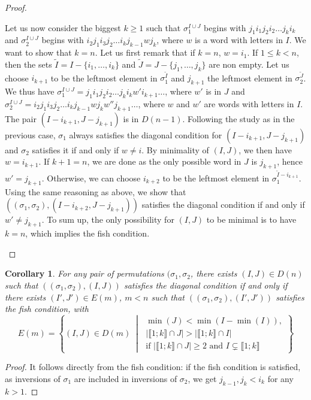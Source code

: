 \documentclass{amsart}
\newtheorem{corollary}[theorem]{Corollary}
\theoremstyle{definition}
\newcommand{\set}[2]{\left\{ #1 \;\middle|\; #2 \right\}} %
\begin{document}
\begin{proof}
\begin{itemize}
Let us now consider the biggest $k\geq 1$ such that $\sigma^{I \cup J}_1$ begins with $j_1 i_1 j_2 i_2 \ldots j_k i_k$ and $\sigma^{I \cup J}_2$ begins with $i_2 j_1 i_3 j_2\ldots i_k j_{k-1} w j_k$, where $w$ is a word with letters in $I$. We want to show that $k=n$. Let us first remark that if $k=n$, $w=i_1$. If $1\leq k<n$, then the sets $\tilde{I}=I-\{i_1, \ldots, i_k\}$ and $\tilde{J}=J-\{j_1, \ldots, j_k\}$ are non empty. Let us choose $i_{k+1}$ to be the leftmost element in $\sigma^{\tilde{I}}_1$ and $j_{k+1}$ the leftmost element in $\sigma^{\tilde{J}}_2$. We thus have $\sigma^{I \cup J}_1=j_1 i_1 j_2 i_2 \ldots j_k i_k w' i_{k+1}\ldots$, where $w'$ is in $J$ and $\sigma^{I \cup J}_2= i_2 j_1 i_3 j_2\ldots i_k j_{k-1} w j_k w'' j_{k+1}\ldots $, where $w$ and $w'$ are words with letters in $I$. The pair $(I-i_{k+1},J-j_{k+1})$ is in $D(n-1)$. Following the study as in the previous case, $\sigma_1$ always satisfies the diagonal condition for $(I-i_{k+1},J-j_{k+1})$ and $\sigma_2$ satisfies it if and only if $w \neq i$. By minimality of $(I,J)$, we then have $w=i_{k+1}$. If $k+1=n$, we are done as the only possible word in $J$ is $j_{k+1}$, hence $w'=j_{k+1}$. Otherwise, we can choose $i_{k+2}$ to be the leftmost element in $\sigma_1^{\tilde{I}-i_{k+1}}$. Using the same reasoning as above, we show that $((\sigma_1, \sigma_2),(I-i_{k+2},J-j_{k+1}))$ satisfies the diagonal condition if and only if $w'\neq j_{k+1}$. To sum up, the only possibility for $(I,J)$ to be minimal is to have $k=n$, which implies the fish condition.
\end{itemize}
\end{proof}

\begin{corollary} For any pair of permutations $(\sigma_1, \sigma_2$, there exists $(I,J) \in D(n)$ such that $((\sigma_1, \sigma_2),(I,J))$ satisfies the diagonal condition if and only if there exists $(I',J') \in E(m)$, $m<n$ such that $((\sigma_1, \sigma_2),(I',J'))$ satisfies the fish condition, with 
\[
E(m)=\set{(I,J)\in D(m)}{\begin{array}{l} \min(J)<\min(I-\min(I)), \\ |\llbracket 1; k \rrbracket \cap J| > |\llbracket 1; k \rrbracket \cap I| \\ \text{if } |\llbracket 1; k \rrbracket \cap J| \geq 2 \text{ and } I \subsetneq \llbracket 1; k \rrbracket \end{array}}
\]
\end{corollary}

\begin{proof}
It follows directly from the fish condition: if the fish condition is satisfied, as inversions of $\sigma_1$ are included in inversions of $\sigma_2$, we get $j_{k-1},j_k<i_k$ for any $k>1$.
\end{proof}
\end{document}
